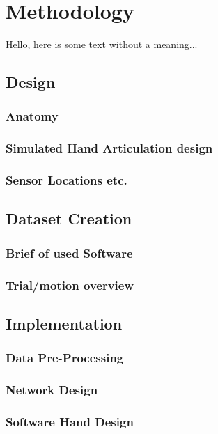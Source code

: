 \documentclass[../main.tex]{subfiles}
\begin{document}
\section{Methodology}
Hello, here is some text without a meaning...

\subsection{Design}
\subsubsection{Anatomy}
\subsubsection{Simulated Hand Articulation design}
\subsubsection{Sensor Locations etc.}

\subsection{Dataset Creation}
\subsubsection{Brief of used Software}
\subsubsection{Trial/motion overview}

\subsection{Implementation}
\subsubsection{Data Pre-Processing}
\subsubsection{Network Design}
\subsubsection{Software Hand Design}
\end{document}
